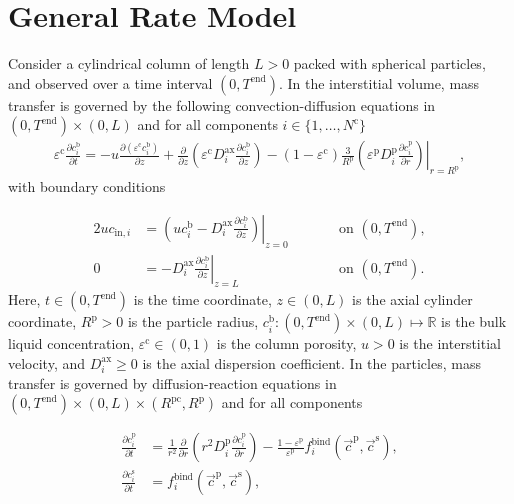 \documentclass{article}
\begin{document}
\section*{General Rate Model}
Consider a cylindrical column of length $L > 0$ packed with spherical particles, and observed over a time interval $(0, T^{\mathrm{end}})$.
In the interstitial volume, mass transfer is governed by the following convection-diffusion equations in $(0, T^\mathrm{end})\times (0, L)$ and for all components $i\in\{1, \dots, N^{\mathrm{c}} \}$
\begin{align}
\varepsilon^{\mathrm{c}} \frac{\partial c^{\mathrm{b}}_i}{\partial t} = - u \frac{\partial \left( \varepsilon^{\mathrm{c}} c^{\mathrm{b}}_i \right)}{\partial z} + \frac{\partial}{\partial z} \left( \varepsilon^{\mathrm{c}} D^{\mathrm{ax}}_{i} \frac{\partial c^{\mathrm{b}}_i}{\partial z} \right)- \left(1 - \varepsilon^{\mathrm{c}} \right) \frac{3}{R^{\mathrm{p}}} \left( \varepsilon^{\mathrm{p}} D^{\mathrm{p}}_{i} \left. \frac{\partial c^{\mathrm{p}}_{i}}{\partial r}\right)\right|_{r = R^{\mathrm{p}}},
\end{align}
with boundary conditions

\begin{alignat}{2}
u c_{\mathrm{in},i} &= \left.\left( u c^{\mathrm{b}}_i - D^{\mathrm{ax}}_{i} \frac{\partial c^{\mathrm{b}}_i}{\partial z}\right)\right|_{z=0} & &\qquad\text{on }(0, T^{\mathrm{end}}),\\
               0 &= - D^{\mathrm{ax}}_{i} \left. \frac{\partial c^{\mathrm{b}}_i}{\partial z} \right|_{z=L} & &\qquad\text{on }(0, T^{\mathrm{end}}).
\end{alignat}
Here, $t\in (0, T^{\mathrm{end}})$ is the time coordinate, $z\in (0, L)$ is the axial cylinder coordinate, $R^\mathrm{p}> 0$ is the particle radius, $c^{\mathrm{b}}_i\colon (0, T^\mathrm{end})\times (0, L) \mapsto \mathbb{R}$ is the bulk liquid concentration, $\varepsilon^{\mathrm{c}}\in (0, 1)$ is the column porosity, $u> 0$ is the interstitial velocity, and $D^\mathrm{ax}_i\geq 0$ is the axial dispersion coefficient.
In the particles, mass transfer is governed by diffusion-reaction equations in $ (0, T^\mathrm{end}) \times (0, L)\times (R^{\mathrm{pc}}, R^{\mathrm{p}})$ and for all components

\begin{align}
\frac{\partial c^{\mathrm{p}}_{i}}{\partial t} &= \frac{1}{r^2} \frac{\partial }{\partial r} \left( r^2 D_{i}^{\mathrm{p}} \frac{\partial c^{\mathrm{p}}_{i}}{\partial r} \right) - \frac{1 - \varepsilon^{\mathrm{p}}}{\varepsilon^{\mathrm{p}}}f^{\mathrm{bind}}_{i}\left( \vec{c}^{\mathrm{p}}, \vec{c}^{\mathrm{s}} \right) , \\
\frac{\partial c^{\mathrm{s}}_{i}}{\partial t} &= f^{\mathrm{bind}}_{i}\left( \vec{c}^{\mathrm{p}}, \vec{c}^{\mathrm{s}} \right) ,
\end{align}
\end{document}

